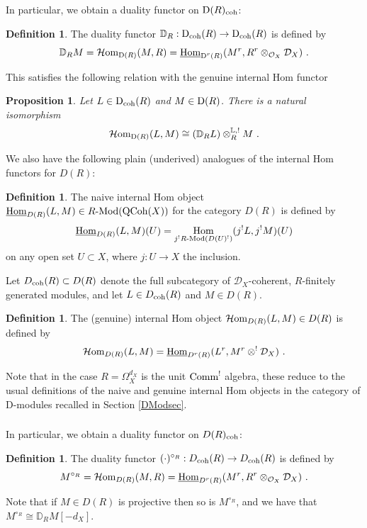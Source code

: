 \documentclass[11pt]{amsart}
\numberwithin{equation}{section}
\newtheorem{prop}[theo]{Proposition}
\theoremstyle{definition}
\newtheorem{defn}[theo]{Definition}
\newcommand{\bb}{\mathbb}
\newcommand{\mc}{\mathcal}
\newcommand{\DDD}{{{\bb D}}}
\DeclareMathOperator{\Hom}{Hom}
\newcommand{\Mod}{{\textup{-Mod}}}
\newcommand{\Comm}{{\textup{Comm}}}
\newcommand{\Homi}{{\mc H\textup{om}}}
\newcommand{\coh}{{\textup{coh}}}
\newcommand{\0}{{\textbf{0}}}
\DeclareMathOperator{\QC}{QCoh}
\newcommand{\Dd}{{\textup{D}}}
\newcommand{\DD}{{D}}
\newcommand{\Homii}{{\underline{\textup{Hom}}}}
\begin{document}
\subsubsection{} In particular, we obtain a duality functor on $\Dd(R)_\coh$:

\begin{defn} The duality functor $\DDD_R:\Dd_\coh(R) \to \Dd_\coh(R)$ is defined by
	\[ \DDD_R M = \Homi_{\Dd(R)}(M, R) = \Homii_{\Dd^r(R)}( M^r, R^r\otimes_{\mc O_X} \mc D_X) \ . \]
\end{defn}

This satisfies the following relation with the genuine internal Hom functor
\begin{prop}\label{Rinthomdescderprop} Let $L\in \Dd_\coh(R)$ and $M\in \Dd(R)$. There is a natural isomorphism
	\[\Homi_{\Dd(R)}(L,M)  \cong (\DDD_R L) \otimes^{\bb L,!}_R M \ . \]
\end{prop}

We also have the following plain (underived) analogues of the internal Hom functors for $\DD(R)$:

\begin{defn}
	The naive internal Hom object $ \Homii_{\DD(R)}(L,M) \in R\Mod(\QC(X))$ for the category $\DD(R)$ is defined by
	\[  \Homii_{\DD(R)}(L,M)(U) = \Hom_{j^!R\Mod(\DD(U)^!)}(j^!L,j^!M)(U) \]
	on any open set $U\subset X$, where $j:U\to X$ the inclusion.
\end{defn}

Let $\DD_\coh(R) \subset \DD(R)$ denote the full subcategory of $\mc D_X$-coherent, $R$-finitely generated modules, and let $L\in \DD_\coh(R)$ and $M\in \DD(R)$.

\begin{defn}  The (genuine) internal Hom object $\Homi_{\DD(R)}(L,M) \in \DD(R)$ is defined by 
	\[\Homi_{\DD(R)}(L,M)  = \Homii_{\DD^r(R)}(L^r, M^r \otimes^! \mc D_X ) \ . \]
\end{defn}
Note that in the case $R=\Omega_X^{d_X}$ is the unit $\Comm^!$ algebra, these reduce to the usual definitions of the naive and genuine internal Hom objects in the category of D-modules recalled in Section \ref{DModsec}.



\subsubsection{} In particular, we obtain a duality functor on $\DD(R)_\coh$:

\begin{defn}\label{circRdefn} The duality functor $(\cdot)^{\circ_R}:\DD_\coh(R) \to \DD_\coh(R)$ is defined by
	\[ M^{\circ_R} = \Homi_{\DD(R)}(M, R) = \Homii_{\DD^r(R)}( M^r, R^r\otimes_{\mc O_X} \mc D_X) \ . \]
\end{defn}
Note that if $M\in \DD(R)$ is projective then so is $M^{\circ_R}$, and we have that $M^{\circ_R} \cong \DDD_R M[-d_X]$.
\end{document}
